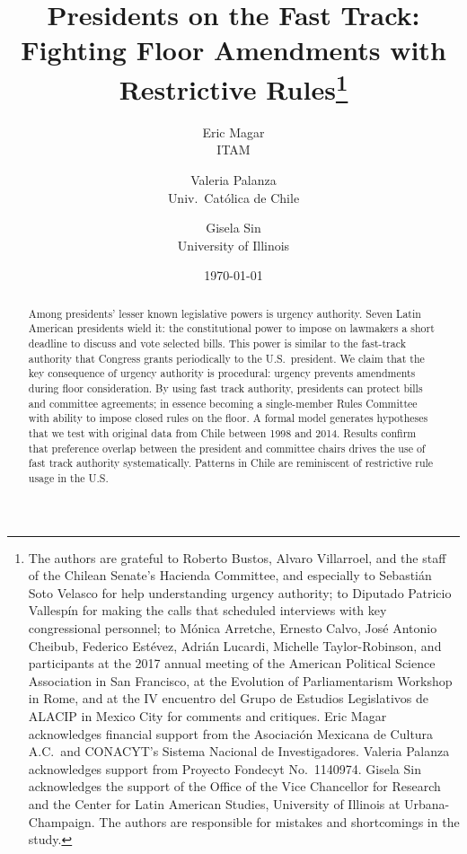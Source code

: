 \documentclass[letter,12pt]{article}
\begin{document}
  

\title{Presidents on the Fast Track: Fighting Floor Amendments with Restrictive Rules\thanks{The authors are grateful to Roberto Bustos, Alvaro Villarroel, and the staff of the Chilean Senate's Hacienda Committee, and especially to Sebastián Soto Velasco for help understanding urgency authority; to Diputado Patricio Vallespín for making the calls that scheduled interviews with key congressional personnel; to Mónica Arretche, Ernesto Calvo, José Antonio Cheibub, Federico Estévez, Adrián Lucardi, Michelle Taylor-Robinson, and participants at the 2017 annual meeting of the American Political Science Association in San Francisco, at the Evolution of Parliamentarism Workshop in Rome, and at the IV encuentro del Grupo de Estudios Legislativos de ALACIP in Mexico City for comments and critiques. Eric Magar acknowledges financial support from the Asociación Mexicana de Cultura A.C.\ and CONACYT's Sistema Nacional de Investigadores. Valeria Palanza acknowledges support from Proyecto Fondecyt No.\ 1140974. Gisela Sin acknowledges the support of the Office of the Vice Chancellor for Research and the Center for Latin American Studies, University of Illinois at Urbana-Champaign. The authors are responsible for mistakes and shortcomings in the study.}}
\author{Eric Magar \\ ITAM \and
        Valeria Palanza \\ Univ.\ Católica de Chile \and  
        Gisela Sin \\ University of Illinois
}
\date{\today}
\maketitle


\begin{abstract}
\noindent Among presidents' lesser known legislative powers is urgency authority. Seven Latin American presidents wield it: the constitutional power to impose on lawmakers a short deadline to discuss and vote selected bills. This power is similar to the fast-track authority that Congress grants periodically to the U.S.\ president. We claim that the key consequence of urgency authority is procedural: urgency prevents amendments during floor consideration. By using fast track authority, presidents can protect bills and committee agreements; in essence becoming a single-member Rules Committee with ability to impose closed rules on the floor. A formal model generates hypotheses that we test with original data from Chile between 1998 and 2014. Results confirm that preference overlap between the president and committee chairs drives the use of fast track authority systematically. Patterns in Chile are reminiscent of restrictive rule usage in the U.S.
\end{abstract}
\end{document}
